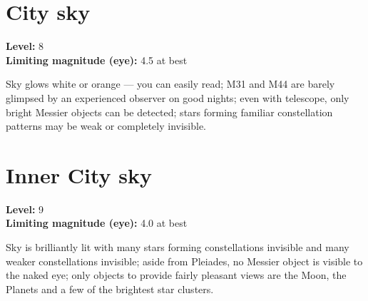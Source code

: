 \section{City sky}
\textbf{Level:} 8 \\
\textbf{Limiting magnitude (eye):} 4.5 at best

Sky glows white or orange --- you can easily read; M31 and M44 are
barely glimpsed by an experienced observer on good nights; even with
telescope, only bright Messier objects can be detected; stars forming
familiar constellation patterns may be weak or completely invisible.

\section{Inner City sky}
\textbf{Level:} 9 \\
\textbf{Limiting magnitude (eye):} 4.0 at best

Sky is brilliantly lit with many stars forming constellations
invisible and many weaker constellations invisible; aside from
Pleiades, no Messier object is visible to the naked eye; only objects
to provide fairly pleasant views are the Moon, the Planets and a few
of the brightest star clusters.



